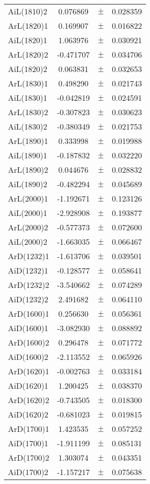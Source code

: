 \begin{table}
\begin{tiny}
\begin{tabular}{lccc}
AiL(1810)2 & 0.076869 & $\pm$ & 0.028359 \\
ArL(1820)1 & 0.169907 & $\pm$ & 0.016822 \\
AiL(1820)1 & 1.063976 & $\pm$ & 0.030921 \\
ArL(1820)2 & -0.471707 & $\pm$ & 0.034706 \\
AiL(1820)2 & 0.063831 & $\pm$ & 0.032653 \\
ArL(1830)1 & 0.498290 & $\pm$ & 0.021743 \\
AiL(1830)1 & -0.042819 & $\pm$ & 0.024591 \\
ArL(1830)2 & -0.307823 & $\pm$ & 0.030623 \\
AiL(1830)2 & -0.380349 & $\pm$ & 0.021753 \\
ArL(1890)1 & 0.333998 & $\pm$ & 0.019988 \\
AiL(1890)1 & -0.187832 & $\pm$ & 0.032220 \\
ArL(1890)2 & 0.044676 & $\pm$ & 0.028832 \\
AiL(1890)2 & -0.482294 & $\pm$ & 0.045689 \\
ArL(2000)1 & -1.192671 & $\pm$ & 0.123126 \\
AiL(2000)1 & -2.928908 & $\pm$ & 0.193877 \\
ArL(2000)2 & -0.577373 & $\pm$ & 0.072600 \\
AiL(2000)2 & -1.663035 & $\pm$ & 0.066467 \\
ArD(1232)1 & -1.613706 & $\pm$ & 0.039501 \\
AiD(1232)1 & -0.128577 & $\pm$ & 0.058641 \\
ArD(1232)2 & -3.540662 & $\pm$ & 0.074289 \\
AiD(1232)2 & 2.491682 & $\pm$ & 0.064110 \\
ArD(1600)1 & 0.256630 & $\pm$ & 0.056361 \\
AiD(1600)1 & -3.082930 & $\pm$ & 0.088892 \\
ArD(1600)2 & 0.296478 & $\pm$ & 0.071772 \\
AiD(1600)2 & -2.113552 & $\pm$ & 0.065926 \\
ArD(1620)1 & -0.002763 & $\pm$ & 0.033184 \\
AiD(1620)1 & 1.200425 & $\pm$ & 0.038370 \\
ArD(1620)2 & -0.743505 & $\pm$ & 0.018300 \\
AiD(1620)2 & -0.681023 & $\pm$ & 0.019815 \\
ArD(1700)1 & 1.423535 & $\pm$ & 0.057252 \\
AiD(1700)1 & -1.911199 & $\pm$ & 0.085131 \\
ArD(1700)2 & 1.303074 & $\pm$ & 0.043351 \\
AiD(1700)2 & -1.157217 & $\pm$ & 0.075638 \\
\bottomrule
\end{tabular}
\end{tiny}
\end{table}

